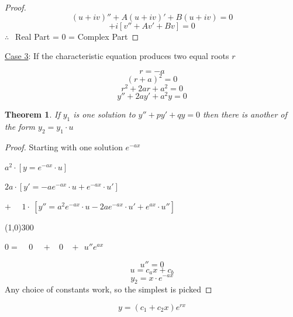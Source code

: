 \documentclass[12pt]{article}
\numberwithin{equation}{subsection}
\newtheorem{theorem}{Theorem}[section]
\newcommand{\inda}{\hspace{.5cm}}
\newcommand{\indc}{\hspace{1.5cm}}
\newcommand{\indj}{\hspace{5cm}}
\begin{document}
\begin{proof}
\begin{equation}
(u+iv)''+A(u+iv)'+B(u+iv)=0
\end{equation}
\begin{equation}
[u''+Au'+Bu]+i[v''+Av'+Bv]=0
\end{equation}
\indj $\therefore\ \ $ Real Part = 0 = Complex Part
\end{proof}

\noindent \underline{Case 3}: If the characteristic equation produces two equal roots $r$

\begin{equation}
r=-a
\end{equation}
\begin{equation}
(r+a)^2=0
\end{equation}
\begin{equation}
r^2+2ar+a^2=0
\end{equation}
\begin{equation}
y''+2ay'+a^2y=0
\end{equation}
\newpage

\begin{theorem}
If $y_1$ is one solution to $y''+py'+qy=0$ then there is another of the form $y_2=y_1 \cdot u$
\end{theorem}

\begin{proof} Starting with one solution $e^{-ax}$
 
\inda $a^2 \cdot [y=e^{-ax} \cdot u]$

\inda $2a \cdot [y'=-ae^{-ax} \cdot u +e^{-ax} \cdot u']$

\noindent $+\ \ \ \ \ \ 1 \cdot \ [y''=a^2e^{-ax} \cdot u -2ae^{-ax} \cdot u' + e^{ax}\cdot u'']$

\line(1,0){300}

\indc $0 = \ \ \ \ \ 0\ \ \ \ \ +\ \ \ \ 0\ \ \ \ + \ \ u''e^{ax} $

\begin{equation}
u''=0
\end{equation}
\begin{equation}
u=c_ax+c_b
\end{equation}
\begin{equation}
y_2=x\cdot e^{-ax}
\end{equation}
Any choice of constants work, so the simplest is picked \end{proof}




\begin{equation}
y=(c_1+c_2x)e^{rx}
\end{equation}\\
\end{document}
